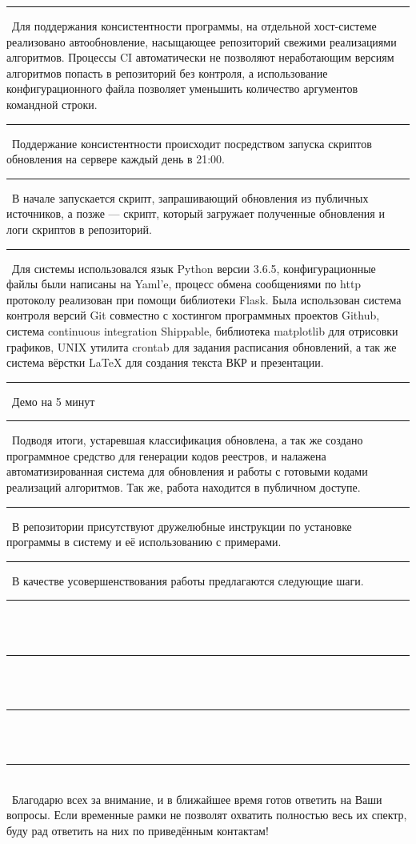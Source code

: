 \documentclass[12pt]{article}
\renewcommand{\line}{\noindent\rule{\textwidth}{1pt}}
\begin{document}
\line\
Для поддержания консистентности программы, на отдельной хост-системе
реализовано автообновление, насыщающее репозиторий свежими реализациями
алгоритмов. Процессы CI автоматически не позволяют неработающим версиям
алгоритмов попасть в репозиторий без контроля, а использование
конфигурационного файла позволяет уменьшить количество аргументов командной
строки.\\
\line\
Поддержание консистентности происходит посредством запуска скриптов обновления
на сервере каждый день в 21:00.\\
\line\
В начале запускается скрипт, запрашивающий обновления из публичных источников,
а позже --- скрипт, который загружает полученные обновления и логи скриптов в
репозиторий.\\
\line\
Для системы использовался язык Python версии 3.6.5, конфигурационные файлы были
написаны на Yaml'e, процесс обмена сообщениями по http протоколу реализован при
помощи библиотеки Flask. Была использован система контроля версий Git совместно
с хостингом программных проектов Github, система continuous integration
Shippable, библиотека matplotlib для отрисовки графиков, UNIX утилита crontab
для задания расписания обновлений, а так же система вёрстки {\LaTeX} для
создания текста ВКР и презентации.\\
\line\
Демо на 5 минут\\
\line\
Подводя итоги, устаревшая классификация обновлена, а так же создано программное
средство для генерации кодов реестров, и налажена автоматизированная система
для обновления и работы с готовыми кодами реализаций алгоритмов. Так же, работа
находится в публичном доступе.\\
\line\
В репозитории присутствуют дружелюбные инструкции по установке программы в
систему и её использованию с примерами.\\
\line\
В качестве усовершенствования работы предлагаются следующие шаги.\\
\line\\\
\line\\\
\line\\\
\line\\\
Благодарю всех за внимание, и в ближайшее время готов ответить на Ваши вопросы.
Если временные рамки не позволят охватить полностью весь их спектр, буду рад
ответить на них по приведённым контактам!


\end{document}
